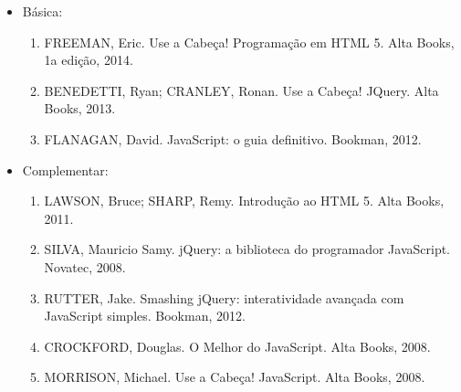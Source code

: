 \begin{itemize}

\item Básica:
    \begin{enumerate}

    \item FREEMAN, Eric.
          Use a Cabeça! Programação em HTML 5.
          Alta Books, 1a edição, 2014.

    \item BENEDETTI, Ryan; CRANLEY, Ronan.
          Use a Cabeça! JQuery.
          Alta Books, 2013.

    \item FLANAGAN, David.
          JavaScript: o guia definitivo.
          Bookman, 2012.

    \end{enumerate}

\item Complementar:
	\begin{enumerate}

    \item LAWSON, Bruce; SHARP, Remy.
          Introdução ao HTML 5.
          Alta Books, 2011.

    \item SILVA, Mauricio Samy.
          jQuery: a biblioteca do programador JavaScript.
          Novatec, 2008.

    \item RUTTER, Jake.
          Smashing jQuery: interatividade avançada com JavaScript simples.
          Bookman, 2012.

    \item CROCKFORD, Douglas.
          O Melhor do JavaScript.
          Alta Books, 2008.

    \item MORRISON, Michael.
          Use a Cabeça! JavaScript.
          Alta Books, 2008.

	\end{enumerate}

\end{itemize}
